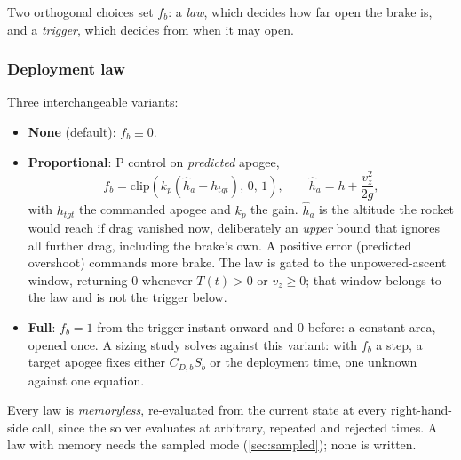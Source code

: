 Two orthogonal choices set $f_b$: a \emph{law}, which decides how far open the brake is, and a
\emph{trigger}, which decides from when it may open.

\subsubsection{Deployment law}\label{sec:airbrake_law}
Three interchangeable variants:
\begin{itemize}
    \item \textbf{None} (default): $f_b\equiv0$.
    \item \textbf{Proportional}: P control on \emph{predicted} apogee,
    \begin{equation} \label{eq:airbrake_p}
        f_b = \mathrm{clip}\!\left(k_p\left(\hat{h}_a-h_{tgt}\right),\,0,\,1\right), \qquad
        \hat{h}_a = h + \frac{v_z^2}{2g},
    \end{equation}
    with $h_{tgt}$ the commanded apogee and $k_p$ the gain. $\hat{h}_a$ is the altitude the rocket
    would reach if drag vanished now, deliberately an \emph{upper} bound that ignores all further
    drag, including the brake's own. A positive error (predicted overshoot) commands more brake.
    The law is gated to the unpowered-ascent window, returning $0$ whenever $T(t)>0$ or $v_z\geq0$;
    that window belongs to the law and is not the trigger below.
    \item \textbf{Full}: $f_b=1$ from the trigger instant onward and $0$ before: a constant area,
    opened once. A sizing study solves against this variant: with $f_b$ a step, a target apogee
    fixes either $C_{D,b}S_b$ or the deployment time, one unknown against one equation.
\end{itemize}
Every law is \emph{memoryless}, re-evaluated from the current state at every right-hand-side call,
since the solver evaluates at arbitrary, repeated and rejected times. A law with memory needs the
sampled mode (\autoref{sec:sampled}); none is written.

